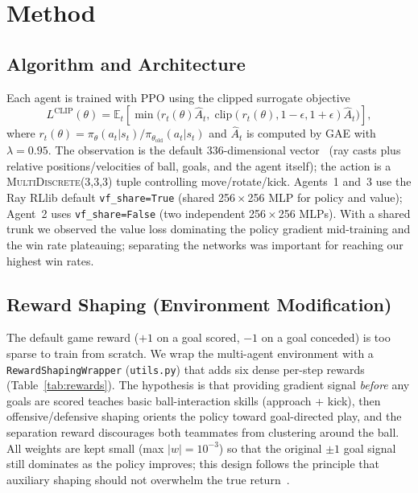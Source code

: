 \documentclass{article}
\begin{document}
\section{Method}
\label{sec:method}

\subsection{Algorithm and Architecture}
\label{sec:algorithm}

Each agent is trained with PPO using the clipped surrogate objective
\begin{equation}
L^{\mathrm{CLIP}}(\theta) = \mathbb{E}_t\!\left[\min\!\big(r_t(\theta)\hat{A}_t,\;
\mathrm{clip}(r_t(\theta), 1-\epsilon, 1+\epsilon)\hat{A}_t\big)\right],
\end{equation}
where $r_t(\theta) = \pi_\theta(a_t|s_t) / \pi_{\theta_{\text{old}}}(a_t|s_t)$ and
$\hat{A}_t$ is computed by GAE with $\lambda=0.95$. The observation is the default
336-dimensional vector~\citep{soccertwos} (ray casts plus relative
positions/velocities of ball, goals, and the agent itself); the action is a
\textsc{MultiDiscrete}(3,3,3) tuple controlling move/rotate/kick. Agents~1 and~3 use
the Ray RLlib default \texttt{vf\_share=True} (shared 256\,$\times$\,256 MLP for policy
and value); Agent~2 uses \texttt{vf\_share=False} (two independent 256\,$\times$\,256
MLPs). With a shared trunk we observed the value loss dominating the policy gradient
mid-training and the win rate plateauing; separating the networks was important for
reaching our highest win rates.

\subsection{Reward Shaping (Environment Modification)}
\label{sec:reward-shaping}

The default game reward ($+1$ on a goal scored, $-1$ on a goal conceded) is too sparse
to train from scratch. We wrap the multi-agent environment with a
\texttt{RewardShapingWrapper} (\texttt{utils.py}) that adds
six dense per-step rewards (Table~\ref{tab:rewards}). The hypothesis is that providing
gradient signal \emph{before} any goals are scored teaches basic ball-interaction
skills (approach + kick), then offensive/defensive shaping orients the policy
toward goal-directed play, and the separation reward discourages both teammates
from clustering around the ball. All weights are kept small (max $|w|\!=\!10^{-3}$)
so that the original $\pm 1$ goal signal still dominates as the policy improves;
this design follows the principle that auxiliary shaping should not overwhelm the
true return~\citep{ng1999shaping}.
\end{document}
